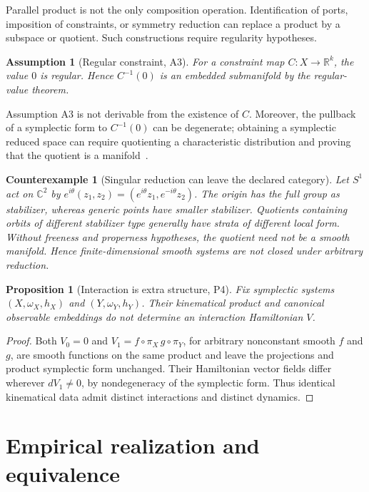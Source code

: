 \documentclass[11pt]{article}
\newtheorem{assumption}[definition]{Assumption}
\newtheorem{proposition}[definition]{Proposition}
\newtheorem{counterexample}[definition]{Counterexample}
\newcommand{\R}{\mathbb{R}}
\begin{document}
Parallel product is not the only composition operation. Identification of ports, imposition of constraints, or symmetry reduction can replace a product by a subspace or quotient. Such constructions require regularity hypotheses.

\begin{assumption}[Regular constraint, A3]
For a constraint map $C:X\to\R^k$, the value $0$ is regular. Hence $C^{-1}(0)$ is an embedded submanifold by the regular-value theorem.
\end{assumption}

Assumption A3 is not derivable from the existence of $C$. Moreover, the pullback of a symplectic form to $C^{-1}(0)$ can be degenerate; obtaining a symplectic reduced space can require quotienting a characteristic distribution and proving that the quotient is a manifold~\cite[Chs.~8,10]{AbrahamMarsden1978}.

\begin{counterexample}[Singular reduction can leave the declared category]
Let $S^1$ act on $\mathbb{C}^2$ by $e^{i\theta}(z_1,z_2)=(e^{i\theta}z_1,e^{-i\theta}z_2)$. The origin has the full group as stabilizer, whereas generic points have smaller stabilizer. Quotients containing orbits of different stabilizer type generally have strata of different local form. Without freeness and properness hypotheses, the quotient need not be a smooth manifold. Hence finite-dimensional smooth systems are not closed under arbitrary reduction.
\end{counterexample}

\begin{proposition}[Interaction is extra structure, P4]
Fix symplectic systems $(X,\omega_X,h_X)$ and $(Y,\omega_Y,h_Y)$. Their kinematical product and canonical observable embeddings do not determine an interaction Hamiltonian $V$.
\end{proposition}

\begin{proof}
Both $V_0=0$ and $V_1=f\circ\pi_X\,g\circ\pi_Y$, for arbitrary nonconstant smooth $f$ and $g$, are smooth functions on the same product and leave the projections and product symplectic form unchanged. Their Hamiltonian vector fields differ wherever $dV_1\ne0$, by nondegeneracy of the symplectic form. Thus identical kinematical data admit distinct interactions and distinct dynamics.
\end{proof}

\section{Empirical realization and equivalence}
\end{document}
